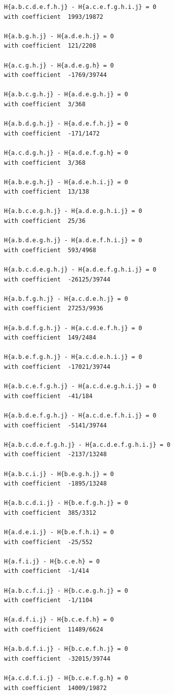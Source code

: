 \documentclass[11pt, a4paper]{kybernetika}
\begin{document}
\begin{verbatim}
		H{a.b.c.d.e.f.h.j} - H{a.c.e.f.g.h.i.j} = 0
		with coefficient  1993/19872
		
		H{a.b.g.h.j} - H{a.d.e.h.j} = 0
		with coefficient  121/2208
		
		H{a.c.g.h.j} - H{a.d.e.g.h} = 0
		with coefficient  -1769/39744
		
		H{a.b.c.g.h.j} - H{a.d.e.g.h.j} = 0
		with coefficient  3/368
		
		H{a.b.d.g.h.j} - H{a.d.e.f.h.j} = 0
		with coefficient  -171/1472
		
		H{a.c.d.g.h.j} - H{a.d.e.f.g.h} = 0
		with coefficient  3/368
		
		H{a.b.e.g.h.j} - H{a.d.e.h.i.j} = 0
		with coefficient  13/138
		
		H{a.b.c.e.g.h.j} - H{a.d.e.g.h.i.j} = 0
		with coefficient  25/36
		
		H{a.b.d.e.g.h.j} - H{a.d.e.f.h.i.j} = 0
		with coefficient  593/4968
		
		H{a.b.c.d.e.g.h.j} - H{a.d.e.f.g.h.i.j} = 0
		with coefficient  -26125/39744
		
		H{a.b.f.g.h.j} - H{a.c.d.e.h.j} = 0
		with coefficient  27253/9936
		
		H{a.b.d.f.g.h.j} - H{a.c.d.e.f.h.j} = 0
		with coefficient  149/2484
		
		H{a.b.e.f.g.h.j} - H{a.c.d.e.h.i.j} = 0
		with coefficient  -17021/39744
		
		H{a.b.c.e.f.g.h.j} - H{a.c.d.e.g.h.i.j} = 0
		with coefficient  -41/184
		
		H{a.b.d.e.f.g.h.j} - H{a.c.d.e.f.h.i.j} = 0
		with coefficient  -5141/39744
		
		H{a.b.c.d.e.f.g.h.j} - H{a.c.d.e.f.g.h.i.j} = 0
		with coefficient  -2137/13248
		
		H{a.b.c.i.j} - H{b.e.g.h.j} = 0
		with coefficient  -1895/13248
		
		H{a.b.c.d.i.j} - H{b.e.f.g.h.j} = 0
		with coefficient  385/3312
		
		H{a.d.e.i.j} - H{b.e.f.h.i} = 0
		with coefficient  -25/552
		
		H{a.f.i.j} - H{b.c.e.h} = 0
		with coefficient  -1/414
		
		H{a.b.c.f.i.j} - H{b.c.e.g.h.j} = 0
		with coefficient  -1/1104
		
		H{a.d.f.i.j} - H{b.c.e.f.h} = 0
		with coefficient  11489/6624
		
		H{a.b.d.f.i.j} - H{b.c.e.f.h.j} = 0
		with coefficient  -32015/39744
		
		H{a.c.d.f.i.j} - H{b.c.e.f.g.h} = 0
		with coefficient  14009/19872
		

\end{verbatim}
\end{document}
